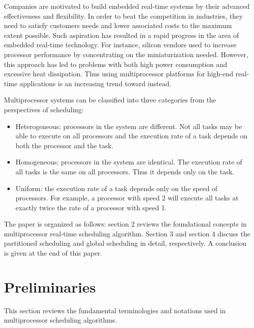 \documentclass[preprint,12pt]{elsarticle}
\begin{document}
Companies are motivated to build embedded real-time systems by their advanced
effectiveness and flexibility. In order to beat the competition in industries,
they need to satisfy customers needs and lower associated costs to the maximum
extent possible. Such aspiration has resulted in a rapid progress in the area
of embedded real-time technology. For instance, silicon vendors used to
increase processor performance by concentrating on the miniaturization needed.
However, this approach has led to problems with both high power consumption and excessive heat dissipation\cite{davis2011survey}. Thus using multiprocessor platforms for high-end real-time applications is an increasing trend toward instead\cite{davis2011survey}.

Multiprocessor systems can be classified into three categories from the perspectives of scheduling\cite{davis2011survey}:

\begin{itemize}
\item Heterogeneous: processors in the system are different. Not all tasks may be able to
execute on all processors and the execution rate of a task depends on both the processor and the task.

\item Homogeneous: processors in the system are identical. The execution rate of all tasks is the same on all processors. Thus it depends only on the task.

\item Uniform: the execution rate of a task depends only on the speed of
    processors. For example, a processor with speed 2 will execute all tasks
    at exactly twice the rate of a processor with speed 1.
\end{itemize}

The paper is organized as follows: section 2 reviews the foundational concepts in multiprocessor real-time scheduling algorithm. Section 3 and section 4 discuss the partitioned scheduling and global scheduling in detail, respectively. A conclusion is given at the end of this paper.

\section{Preliminaries} \label{S:2}

This section reviews the fundamental terminologies and notations used in multiprocessor scheduling algorithms.
\end{document}
